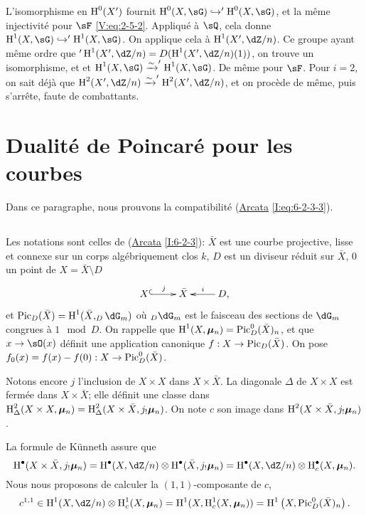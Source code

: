 L'isomorphisme en $\operatorname{H}^0(X')$ fournit $\h^0(X,\sG)\hookrightarrow '\h^0(X,\sG)$, 
et la m\^eme injectivit\'e pour $\sF$ \eqref{V:eq:2-5-2}. Appliqu\'e \`a $\sQ$, 
cela donne $\h^1(X,\sG)\hookrightarrow '\h^1(X,\sG)$. On applique cela \`a 
$\h^1(X',\dZ/n)$. Ce groupe ayant m\^eme ordre que 
$'\h^1(X',\dZ/n)=D(\h^1(X',\dZ/n)(1))$, on trouve un isomorphisme, et et 
$\h^1(X,\sG) \iso '\h^1(X,\sG)$. De m\^eme pour $\sF$. Pour $i=2$, on sait 
d\'ej\`a que $\h^2(X',\dZ/n) \iso '\h^2(X',\dZ/n)$, et on proc\`ede de m\^eme, 
puis s'arr\^ete, faute de combattants. 










\section{Dualit\'e de Poincar\'e pour les courbes}\label{V:3}

Dans ce paragraphe, nous prouvons la compatibilit\'e (\hyperref[I]{Arcata}  
\ref{I:eq:6-2-3-3}). 





\subsection{}\label{V:3-1}

Les notations sont celles de (\hyperref[I]{Arcata} \ref{I:6-2-3}): $\bar X$ est 
une courbe projective, lisse et connexe sur un corps alg\'ebriquement clos $k$, 
$D$ est un diviseur r\'eduit sur $\bar X$, $0$ un point de 
$X=\bar X\setminus D$ 
\[\xymatrix{
  X \ar@{^{(}->}[r]^-j 
    & \bar X 
    & \ar[l]_-i D \text{,}
}\]
et $\pic_D(\bar X)=\h^1(\bar X,_D\dG_m)$ o\`u $_D\dG_m$ est le faisceau des 
sections de $\dG_m$ congrues \`a $1\mod D$. On rappelle que 
$\operatorname{H}^1(X,{\bm\mu}_n) = \operatorname{Pic}_D^0(\bar X)_n$, et que $x\to \sO(x)$ d\'efinit une 
application canonique $f:X\to \operatorname{Pic}_D(\bar X)$. On pose 
$f_0(x)=f(x)-f(0):X\to \operatorname{Pic}_D^0(\bar X)$.

Notons encore $j$ l'inclusion de $X\times X$ dans $X\times \bar X$. La 
diagonale $\Delta$ de $X\times X$ est ferm\'ee dans $X\times \bar X$; elle 
d\'efinit une classe dans 
$\operatorname{H}_\Delta^2(X\times X,{\bm\mu}_n)=\operatorname{H}_\Delta^2(X\times \bar X,j_!{\bm\mu}_n)$. On note 
$c$ son image dans $\operatorname{H}^2(X\times \bar X,j_!{\bm\mu}_n)$. 

La formule de K\"unneth assure que 
\[
  \h^\bullet(X\times \bar X,j_!\dmu_n) = \h^\bullet(X,\dZ/n)\otimes \h^\bullet(\bar X,j_!\dmu_n) = \h^\bullet(X,\dZ/n)\otimes \h_c^\bullet(X,\dmu_n) \text{.}
\]
Nous nous proposons de calculer la $(1,1)$-composante de $c$, 
\[
  c^{1,1} \in \h^1(X,\dZ/n)\otimes \h_c^1(X,\dmu_n) = \h^1(X,\h_c^1(X,\dmu_n)) = \h^1\left(X,\pic_D^0(\bar X)_n\right) \text{.}
\]

